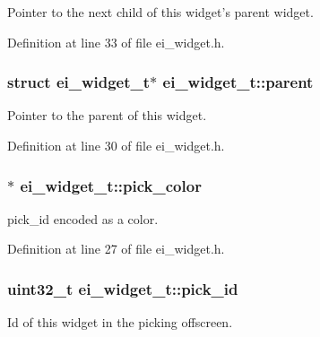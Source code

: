 Pointer to the next child of this widget's parent widget. 



Definition at line 33 of file ei\-\_\-widget.\-h.

\hypertarget{structei__widget__t_adb1b43eda89c8e86d6337c939f1a4473}{
\subsubsection[{parent}]{\setlength{\rightskip}{0pt plus 5cm}struct {\bf ei\-\_\-widget\-\_\-t}$\ast$ ei\-\_\-widget\-\_\-t\-::parent}}\label{structei__widget__t_adb1b43eda89c8e86d6337c939f1a4473}


Pointer to the parent of this widget. 



Definition at line 30 of file ei\-\_\-widget.\-h.

\hypertarget{structei__widget__t_ad1477adf8e6b5cb6a5f11f657fe4781b}{
\subsubsection[{pick\-\_\-color}]{$\ast$ ei\-\_\-widget\-\_\-t\-::pick\-\_\-color}}\label{structei__widget__t_ad1477adf8e6b5cb6a5f11f657fe4781b}


pick\-\_\-id encoded as a color. 



Definition at line 27 of file ei\-\_\-widget.\-h.

\hypertarget{structei__widget__t_ada7ce878377d653d930a57e175b61182}{
\subsubsection[{pick\-\_\-id}]{\setlength{\rightskip}{0pt plus 5cm}uint32\-\_\-t ei\-\_\-widget\-\_\-t\-::pick\-\_\-id}}\label{structei__widget__t_ada7ce878377d653d930a57e175b61182}


Id of this widget in the picking offscreen. 



